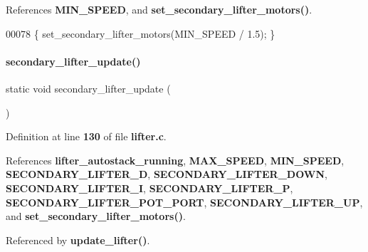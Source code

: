 References \textbf{ M\+I\+N\+\_\+\+S\+P\+E\+ED}, and \textbf{ set\+\_\+secondary\+\_\+lifter\+\_\+motors()}.


\begin{DoxyCode}
00078 \{ set_secondary_lifter_motors(MIN_SPEED / 1.5); \}
\end{DoxyCode}
\mbox{\label{a00107_ac59fe6ffc80bab7f117ec0a8e482277b}} 
\paragraph{secondary\+\_\+lifter\+\_\+update()}
{\footnotesize\ttfamily static void secondary\+\_\+lifter\+\_\+update (\begin{DoxyParamCaption}{ }\end{DoxyParamCaption})\hspace{0.3cm}{\ttfamily [static]}}



Definition at line \textbf{ 130} of file \textbf{ lifter.\+c}.



References \textbf{ lifter\+\_\+autostack\+\_\+running}, \textbf{ M\+A\+X\+\_\+\+S\+P\+E\+ED}, \textbf{ M\+I\+N\+\_\+\+S\+P\+E\+ED}, \textbf{ S\+E\+C\+O\+N\+D\+A\+R\+Y\+\_\+\+L\+I\+F\+T\+E\+R\+\_\+D}, \textbf{ S\+E\+C\+O\+N\+D\+A\+R\+Y\+\_\+\+L\+I\+F\+T\+E\+R\+\_\+\+D\+O\+WN}, \textbf{ S\+E\+C\+O\+N\+D\+A\+R\+Y\+\_\+\+L\+I\+F\+T\+E\+R\+\_\+I}, \textbf{ S\+E\+C\+O\+N\+D\+A\+R\+Y\+\_\+\+L\+I\+F\+T\+E\+R\+\_\+P}, \textbf{ S\+E\+C\+O\+N\+D\+A\+R\+Y\+\_\+\+L\+I\+F\+T\+E\+R\+\_\+\+P\+O\+T\+\_\+\+P\+O\+RT}, \textbf{ S\+E\+C\+O\+N\+D\+A\+R\+Y\+\_\+\+L\+I\+F\+T\+E\+R\+\_\+\+UP}, and \textbf{ set\+\_\+secondary\+\_\+lifter\+\_\+motors()}.



Referenced by \textbf{ update\+\_\+lifter()}.


